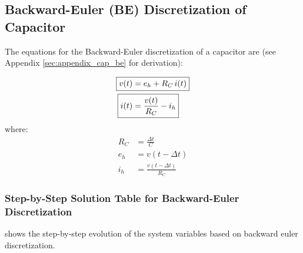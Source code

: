 \vspace{1em}

\subsection{Backward-Euler (BE) Discretization of Capacitor}


The equations for the Backward-Euler discretization of a capacitor are (see Appendix \ref{sec:appendix_cap_be} for derivation):

\begin{tcolorbox}[colback=deepBlue!5, colframe=deepBlue!80!black, title={\color{white}\textbf{Backward Euler: Capacitor Companion Model}}]
\begin{align}
    \Aboxed{v(t) &= e_h + R_C\, i(t)} \label{eq:vt_cap_be} \\
    \Aboxed{i(t) &= \frac{v(t)}{R_C} - i_h} \label{eq:it_cap_be}
\end{align}
where:
\begin{align}
    R_C &= \frac{\Delta t}{C} \\
    e_h &= v(t-\Delta t) \\
    i_h &= \frac{v(t-\Delta t)}{R_C}
\end{align}
\end{tcolorbox}

\vspace{1em}
\subsubsection*{Step-by-Step Solution Table for Backward-Euler Discretization}

 shows the step-by-step evolution of the system variables based on backward euler discretization.

